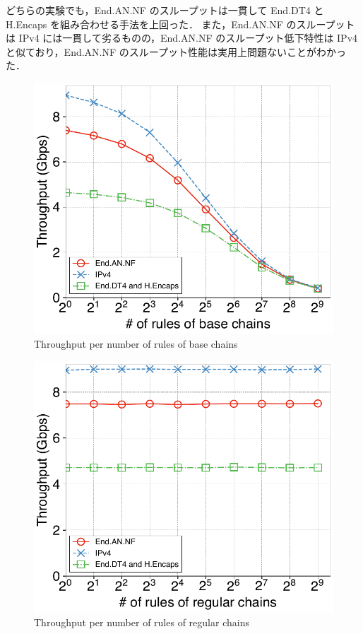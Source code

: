どちらの実験でも，End.AN.NF のスループットは一貫して End.DT4 と H.Encaps を組み合わせる手法を上回った．
また，End.AN.NF のスループットは IPv4 には一貫して劣るものの，End.AN.NF のスループット低下特性は IPv4 と似ており，End.AN.NF のスループット性能は実用上問題ないことがわかった．

\begin{figure}[t]
  \centering
  \includegraphics[width=0.95\linewidth]{img/rule-throughput.pdf}
  \caption{Throughput per number of rules of base chains}
  \label{fig:rule-thru}
\end{figure}

\begin{figure}[t]
  \centering
  \includegraphics[width=0.95\linewidth]{img/regular-throughput.pdf}
  \caption{Throughput per number of rules of regular chains}
  \label{fig:reg-thru}
\end{figure}

